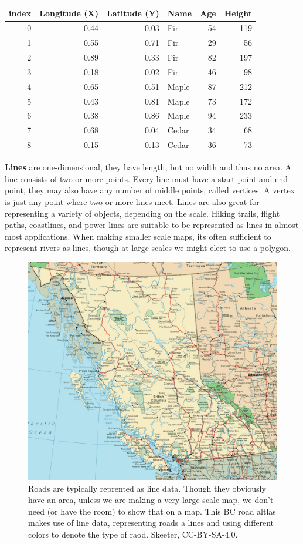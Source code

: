 \documentclass[
]{book}
\begin{document}
\begin{longtable}[]{@{}rrrlrr@{}}
\toprule
index & Longitude (X) & Latitude (Y) & Name & Age & Height \\
\midrule
\endhead
0 & 0.44 & 0.03 & Fir & 54 & 119 \\
1 & 0.55 & 0.71 & Fir & 29 & 56 \\
2 & 0.89 & 0.33 & Fir & 82 & 197 \\
3 & 0.18 & 0.02 & Fir & 46 & 98 \\
4 & 0.65 & 0.51 & Maple & 87 & 212 \\
5 & 0.43 & 0.81 & Maple & 73 & 172 \\
6 & 0.38 & 0.86 & Maple & 94 & 233 \\
7 & 0.68 & 0.04 & Cedar & 34 & 68 \\
8 & 0.15 & 0.13 & Cedar & 36 & 73 \\
\bottomrule
\end{longtable}

\textbf{Lines} are one-dimensional, they have length, but no width and thus no area. A line consists of two or more points. Every line must have a start point and end point, they may also have any number of middle points, called vertices. A vertex is just any point where two or more lines meet. Lines are also great for representing a variety of objects, depending on the scale. Hiking trails, flight paths, coastlines, and power lines are suitable to be represented as lines in almost most applications. When making smaller scale maps, its often sufficient to represent rivers as lines, though at large scales we might elect to use a polygon.

\begin{figure}
\includegraphics[width=0.75\linewidth]{images/03-bc-road-map} \caption{Roads are typically reprented as line data.  Though they obviously have an area, unless we are making a very large scale map, we don't need (or have the room) to show that on a map.  This BC road altlas makes use of line data, representing roads a lines and using different colors to denote the type of raod. Skeeter, CC-BY-SA-4.0.}\label{fig:3-bc-road-map}
\end{figure}
\end{document}
